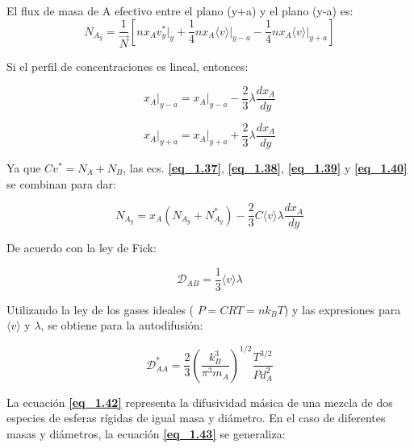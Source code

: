         
        El flux de masa de A efectivo entre el plano (y+a) y el plano (y-a) es:
        \begin{equation}
N_{A_{y}} = \frac{1}{\vec{N}} \left[ n x_A  v_y^* \bigg|_{y} + \frac{1}{4}n x_A \langle v \rangle \bigg|_{y-a}- \frac{1}{4} nx_A\langle v \rangle \bigg|_{y+a} \right]
\tag{1.38} \label{eq_1.38}
\end{equation}

Si el perfil de concentraciones es lineal, entonces:

\begin{equation}
x_A \bigg|_{y-a} = x_A \bigg|_{y-a} - \frac{2}{3}\lambda \frac{dx_A}{dy}
\tag{1.39} \label{eq_1.39}
\end{equation}

\begin{equation}
x_A \bigg|_{y+a} = x_A \bigg|_{y+a} + \frac{2}{3}\lambda \frac{dx_A}{dy}
\tag{1.40} \label{eq_1.40}
\end{equation}

Ya que \( Cv^* = N_A + N_B \), las ecs. \textbf{\eqref{eq_1.37}}, \textbf{\eqref{eq_1.38}}, \textbf{\eqref{eq_1.39}} y \textbf{\eqref{eq_1.40}} se combinan para dar:

\begin{equation}
N_{A_{y}} = x_A \left( N_{A_y} + N_{A_y}^* \right) - \frac{2}{3}C \langle v \rangle \lambda \frac{dx_A}{dy} \tag{1.41}\label{eq_1.41}
\end{equation}

De acuerdo con la ley de Fick:

\begin{equation}
\mathscr{D}_{AB} = \frac{1}{3} \langle v \rangle \lambda  \tag{1.42}\label{eq_1.42}
\end{equation}

Utilizando la ley de los gases ideales ( $P = CRT = nk_BT $) y las expresiones para \( \langle v \rangle \) y \( \lambda \), se obtiene para la autodifusión:

\begin{equation}
\mathscr{D}_{AA}^* = \frac{2}{3} \left( \frac{k_B^3}{\pi^3 m_A} \right)^{1/2} \frac{T^{3/2}}{P d_A^2}\tag{1.43}\label{eq_1.43}
\end{equation}

La ecuación \textbf{\eqref{eq_1.42}} representa la difusividad másica de una mezcla de dos especies de esferas rígidas de igual masa y diámetro. En el caso de diferentes masas y diámetros, la ecuación \textbf{\eqref{eq_1.43}} se generaliza:

